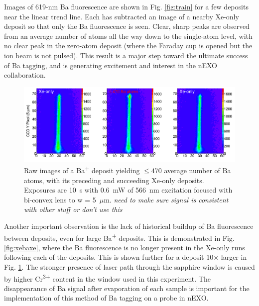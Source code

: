 Images of 619-nm Ba fluorescence are shown in Fig. \ref{fig:train} for a few deposits near the linear trend line.  Each has subtracted an image of a nearby Xe-only deposit so that only the Ba fluorescence is seen.  Clear, sharp peaks are observed from an average number of atoms all the way down to the single-atom level, with no clear peak in the zero-atom deposit (where the Faraday cup is opened but the ion beam is not pulsed).  This result is a major step toward the ultimate success of Ba tagging, and is generating excitement and interest in the nEXO collaboration.

\begin{figure} %
        \centering
                \includegraphics[width=.95\textwidth]{figures/xebaxe_larger_average.png}
                \caption{Raw images of a Ba\textsuperscript{+} deposit yielding $\leq 470$ average number of Ba atoms, with its preceding and succeeding Xe-only deposits.  Exposures are 10~s with 0.6~mW of 566~nm excitation focused with bi-convex lens to w = 5~$\mu$m. \emph{\color{red}need to make sure signal is consistent with other stuff or don't use this}}
\label{fig:xebaxeLarger}
\end{figure}

Another important observation is the lack of historical buildup of Ba fluorescence between deposits, even for large Ba\textsuperscript{+} deposits.  This is demonstrated in Fig. \ref{fig:xebaxe}, where the Ba fluorescence is no longer present in the Xe-only runs following each of the deposits.  This is shown further for a deposit 10$\times$ larger in Fig. \ref{fig:xebaxeLarger}.  The stronger presence of laser path through the sapphire window is caused by higher Cr\textsuperscript{3+} content in the window used in this experiment.  The disappearance of Ba signal after evaporation of each sample is important for the implementation of this method of Ba tagging on a probe in nEXO.



